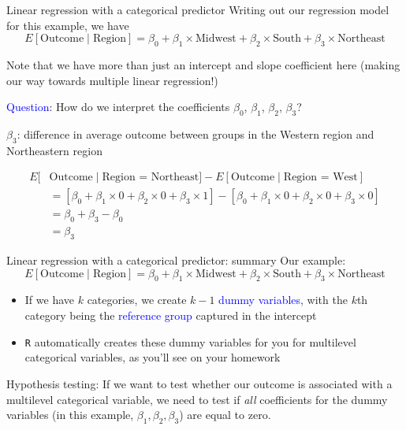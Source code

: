 \documentclass[10pt,t]{beamer}
\begin{document}
\begin{frame}{Linear regression with a categorical predictor}
Writing out our regression model for this example, we have
$$
E[\text{Outcome} \mid \text{Region}] = \beta_0 + \beta_1 \times \text{Midwest} + \beta_2 \times \text{South} + \beta_3 \times \text{Northeast}
$$

Note that we have more than just an intercept and slope coefficient here (making our way towards multiple linear regression!)

\vspace{0.3cm}

\textcolor{blue}{Question}: How do we interpret the coefficients $\beta_0$, $\beta_1$, $\beta_2$, $\beta_3$?

\vspace{0.3cm}

$\beta_3$: difference in average outcome between groups in the Western region and Northeastern region

\begin{align*}
E[&\text{Outcome} \mid  \text{Region = Northeast}] - E[\text{Outcome} \mid \text{Region = West}] \\
& = [\beta_0 + \beta_1 \times 0 + \beta_2 \times 0 + \beta_3 \times 1] - [\beta_0 + \beta_1 \times 0 + \beta_2 \times 0 + \beta_3 \times 0] \\
& = \beta_0 + \beta_3 - \beta_0 \\
& = \beta_3
\end{align*}

\end{frame}

\begin{frame}{Linear regression with a categorical predictor: summary}
Our example:
$$
E[\text{Outcome} \mid \text{Region}] = \beta_0 + \beta_1 \times \text{Midwest} + \beta_2 \times \text{South} + \beta_3 \times \text{Northeast}
$$

\begin{itemize}
	\item If we have $k$ categories, we create $k - 1$ \textcolor{blue}{dummy variables}, with the $k$th category being the \textcolor{blue}{reference group} captured in the intercept
	\item \texttt{R} automatically creates these dummy variables for you for multilevel categorical variables, as you'll see on your homework
\end{itemize}

\vspace{0.3cm}

Hypothesis testing: If we want to test whether our outcome is associated with a multilevel categorical variable, we need to test if \textit{all} coefficients for the dummy variables (in this example, $\beta_1, \beta_2, \beta_3$) are equal to zero.

\end{frame}
\end{document}
